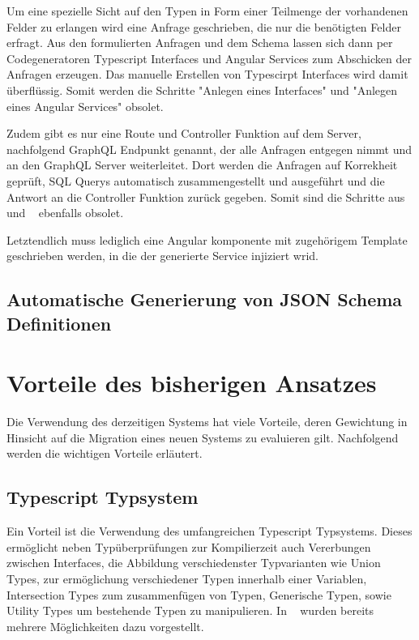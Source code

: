 Um eine spezielle Sicht auf den Typen in Form einer Teilmenge der vorhandenen Felder zu erlangen wird eine Anfrage geschrieben, die
nur die benötigten Felder erfragt. Aus den formulierten Anfragen und dem Schema lassen sich dann per Codegeneratoren Typescript Interfaces und
Angular Services zum Abschicken der Anfragen erzeugen. Das manuelle Erstellen von Typescirpt Interfaces wird damit überflüssig.
Somit werden die Schritte "Anlegen eines Interfaces" und "Anlegen eines Angular Services" obsolet.

Zudem gibt es nur eine Route und Controller Funktion auf dem Server, nachfolgend GraphQL Endpunkt genannt, der alle Anfragen entgegen nimmt
und an den GraphQL Server weiterleitet. Dort werden die Anfragen auf Korrekheit geprüft,
SQL Querys automatisch zusammengestellt und ausgeführt und die Antwort an die Controller Funktion zurück gegeben.
Somit sind die Schritte aus  und ~ ebenfalls obsolet.

Letztendlich muss lediglich eine Angular komponente mit zugehörigem Template geschrieben werden, in die der generierte Service injiziert wrid.

\subsection{Automatische Generierung von JSON Schema Definitionen}
\label{sec:requirements:example:autogeneration}

\section{Vorteile des bisherigen Ansatzes}
\label{sec:requirements:pros}
Die Verwendung des derzeitigen Systems hat viele Vorteile,
deren Gewichtung in Hinsicht auf die Migration eines neuen Systems zu evaluieren gilt.
Nachfolgend werden die wichtigen Vorteile erläutert.

\subsection{Typescript Typsystem}
\label{sec:requirements:pros:typescript}
Ein Vorteil ist die Verwendung des umfangreichen Typescript Typsystems.
Dieses ermöglicht neben Typüberprüfungen zur Kompilierzeit auch Vererbungen zwischen Interfaces, die Abbildung verschiedenster Typvarianten wie
Union Types, zur ermöglichung verschiedener Typen innerhalb einer Variablen, Intersection Types zum zusammenfügen von Typen,
Generische Typen, sowie Utility Types um bestehende Typen zu manipulieren.
In ~ wurden bereits mehrere Möglichkeiten dazu vorgestellt.

